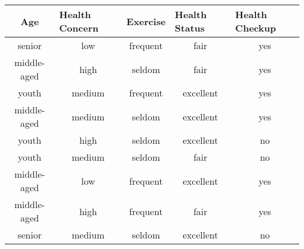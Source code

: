 \documentclass{homework}
\begin{document}
    \begin{table}[!h]
    \begin{center}
    \begin{tabular}{|c|c|c|c|c|}
    \hline
    \textbf{Age} & \multicolumn{1}{l|}{\textbf{Health Concern}} & \multicolumn{1}{l|}{\textbf{Exercise}} & \multicolumn{1}{l|}{\textbf{Health Status}} & \multicolumn{1}{l|}{\textbf{Health Checkup}} \\ \hline
    senior       & low                                          & frequent                               & fair                                        & yes                                          \\ \hline
    middle-aged  & high                                         & seldom                                 & fair                                        & yes                                          \\ \hline
    youth        & medium                                       & frequent                               & excellent                                   & yes                                          \\ \hline
    middle-aged  & medium                                       & seldom                                 & excellent                                   & yes                                          \\ \hline
    youth        & high                                         & seldom                                 & excellent                                   & no                                           \\ \hline
    youth        & medium                                       & seldom                                 & fair                                        & no                                           \\ \hline
    middle-aged  & low                                          & frequent                               & excellent                                   & yes                                          \\ \hline
    middle-aged  & high                                         & frequent                               & fair                                        & yes                                          \\ \hline
    senior       & medium                                       & seldom                                 & excellent                                   & no                                           \\ \hline

\end{tabular}
\end{center}
\end{table}
\end{document}
